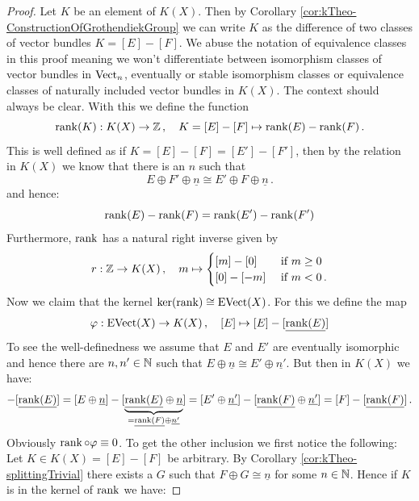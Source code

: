 \begin{proof}
Let $K$ be an element of $K(X)$. Then by Corollary \ref{cor:kTheo-ConstructionOfGrothendiekGroup} we can write $K$ as the difference of two classes of vector bundles $K=[E]-[F]$. We abuse the notation of equivalence classes in this proof meaning we won't differentiate between isomorphism classes of vector bundles in $\operatorname{\mathrm{Vect}}_n$, eventually or stable isomorphism classes or equivalence classes of naturally included vector bundles in $K(X)$. The context should always be clear.  With this we define the function
	\begin{equation*}
		\operatorname{\mathrm{rank}}(K): K(X)\to \mathbb{Z}\,,\quad K=[E]-[F] \mapsto \operatorname{\mathrm{rank}}(E)-\operatorname{\mathrm{rank}}(F)\,.
	\end{equation*} This is well defined as if $K=[E]-[F]=[E']-[F']$, then by the relation in $K(X)$ we know that there is an $n$ such that
	\begin{equation*}
		E\oplus F' \oplus \underline{n}\cong E' \oplus F \oplus \underline{n}\,.
	\end{equation*} and hence:
	\begin{equation*}
		\operatorname{\mathrm{rank}}(E)-\operatorname{\mathrm{rank}}(F)=\operatorname{\mathrm{rank}}(E')-\operatorname{\mathrm{rank}}(F')
	\end{equation*} Furthermore, $\operatorname{\mathrm{rank}}$ has a natural right inverse given by
	\begin{equation*}
		r: \mathbb{Z} \to K(X)\,,\quad m\mapsto \begin{cases}
			[m]-[0]& \text{ if }m\geq 0\\
			[0]-[-m]& \text{ if }m<0\,.
		\end{cases}
	\end{equation*}
	Now we claim that the kernel $\ker(\operatorname{\mathrm{rank}})\cong \mathrm{EVect}(X)$. For this we define the map 
	\begin{equation*}
		\varphi: \mathrm{EVect}(X)\to K(X)\,,\quad [E]\mapsto [E] -[\underline{\operatorname{\mathrm{rank}}(E)}]
	\end{equation*}To see the well-definedness we assume that $E$ and $E'$ are eventually isomorphic and hence there are $n,n'\in \mathbb{N}$ such that $E\oplus \underline{n}\cong E'\oplus \underline{n'}$. But then in $K(X)$ we have:
	\begin{equation*}
		[E]-[\underline{\rank(E)}]=[E\oplus \underline{n}]-[\underbrace{\underline{\rank(E)}\oplus\underline{n}}_{=\underline{\rank(F)}\oplus \underline{n'}}]=[E'\oplus \underline{n'}]-[\underline{\rank(F)}\oplus \underline{n'}]=[F]-[\underline{\rank(F)}]\,.
	\end{equation*}
	Obviously $\operatorname{\mathrm{rank}}\circ \varphi \equiv 0$. To get the other inclusion we first notice the following: Let $K\in K(X)=[E]-[F]$ be arbitrary. By Corollary \ref{cor:kTheo-splittingTrivial} there exists a $G$ such that $F\oplus G\cong \underline{n}$ for some $n\in \mathbb{N}$. Hence if $K$ is in the kernel of $\operatorname{\mathrm{rank}}$ we have:

\end{proof}
